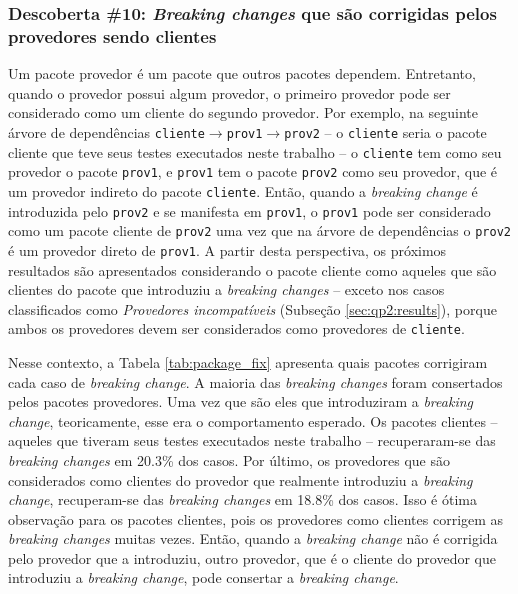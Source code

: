 \subsubsection{Descoberta \#10: \textit{Breaking changes} que são corrigidas pelos provedores sendo clientes}

Um pacote provedor é um pacote que outros pacotes dependem. Entretanto, quando o provedor possui algum provedor, o primeiro provedor pode ser considerado como um cliente do segundo provedor. Por exemplo, na seguinte árvore de dependências  \texttt{cliente}$\rightarrow$\texttt{prov1}$\rightarrow$\texttt{prov2} -- o \texttt{cliente} seria o pacote cliente que teve seus testes executados neste trabalho -- o \texttt{cliente} tem como seu provedor o pacote \texttt{prov1}, e \texttt{prov1} tem o pacote \texttt{prov2} como seu provedor, que é um provedor indireto do pacote \texttt{cliente}. Então, quando a \textit{breaking change} é introduzida pelo \texttt{prov2} e se manifesta em \texttt{prov1}, o \texttt{prov1} pode ser considerado como um pacote cliente de \texttt{prov2} uma vez que na árvore de dependências o \texttt{prov2} é um provedor direto de \texttt{prov1}. A partir desta perspectiva, os próximos resultados são apresentados considerando o pacote cliente como aqueles que são clientes do pacote que introduziu a \textit{breaking changes} -- exceto nos casos classificados como \textit{Provedores incompatíveis} (Subseção \ref{sec:qp2:results}), porque ambos os provedores devem ser considerados como provedores de \texttt{cliente}.

Nesse contexto, a Tabela \ref{tab:package_fix} apresenta quais pacotes corrigiram cada caso de \textit{breaking change}. A maioria das \textit{breaking changes} foram consertados pelos pacotes provedores. Uma vez que são eles que introduziram a \textit{breaking change}, teoricamente, esse era o comportamento esperado. Os pacotes clientes -- aqueles que tiveram seus testes executados neste trabalho -- recuperaram-se das \textit{breaking changes} em 20.3\% dos casos. Por último, os provedores que são considerados como clientes do provedor que realmente introduziu a \textit{breaking change}, recuperam-se das \textit{breaking changes} em 18.8\% dos casos. Isso é ótima observação para os pacotes clientes, pois os provedores como clientes corrigem as \textit{breaking changes} muitas vezes. Então, quando a \textit{breaking change} não é corrigida pelo provedor que a introduziu, outro provedor, que é o cliente do provedor que introduziu a \textit{breaking change}, pode consertar a \textit{breaking change}.

